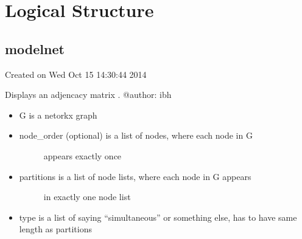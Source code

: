 \documentclass[letterpaper,10pt,english]{sphinxmanual}
\begin{document}
\chapter{Logical Structure}
\label{\detokenize{index:logical-structure}}

\section{modelnet}
\label{\detokenize{index:module-modelnet}}\label{\detokenize{index:modelnet}}
\sphinxAtStartPar
Created on Wed Oct 15 14:30:44 2014

\sphinxAtStartPar
Displays an adjencacy matrix
.
@author: ibh

\begin{fulllineitems}
\label{\detokenize{index:modelnet.draw_adjacency_matrix}}
\pysigstartsignatures
{}
\pysigstopsignatures\begin{itemize}
\item {} 
\sphinxAtStartPar
G is a netorkx graph

\item {} \begin{description}
\item[{node\_order (optional) is a list of nodes, where each node in G}] \leavevmode
\sphinxAtStartPar
appears exactly once

\end{description}

\item {} \begin{description}
\item[{partitions is a list of node lists, where each node in G appears}] \leavevmode
\sphinxAtStartPar
in exactly one node list

\end{description}

\item {} 
\sphinxAtStartPar
type is a list of saying “simultaneous” or something else, has to have same length as partitions

\end{itemize}

\end{fulllineitems}
\end{document}
